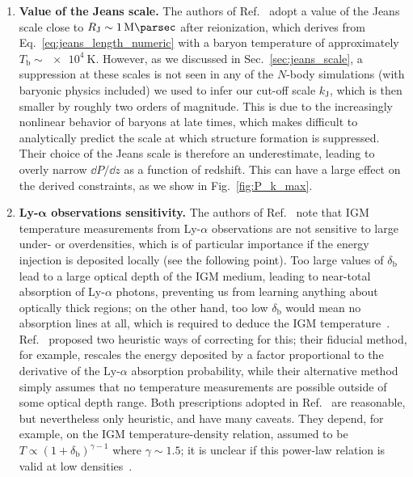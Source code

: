 \documentclass[prd,aps,10pt,nofootinbib,twocolumn,superscriptaddress,preprintnumbers,balancelastpage,longbibliography]{revtex4-1}
\begin{document}
\begin{enumerate}
\item \textbf{Value of the Jeans scale.} The authors of Ref.~\cite{Witte:2020rvb} adopt a value of the Jeans scale close to $R_\text{J} \sim \SI{1}{\mega\parsec}$ after reionization, which derives from Eq.~\eqref{eq:jeans_length_numeric} with a baryon temperature of approximately $T_\text{b} \sim \SI{e4}{\kelvin}$. 
However, as we discussed in Sec.~\ref{sec:jeans_scale}, a suppression at these scales is not seen in any of the $N$-body simulations (with baryonic physics included) we used to infer our cut-off scale $k_\text{J}$, which is then smaller by roughly two orders of magnitude. 
This is due to the increasingly nonlinear behavior of baryons at late times, which makes difficult to analytically predict the scale at which structure formation is suppressed. 
Their choice of the Jeans scale is therefore an underestimate, leading to overly narrow $\dd P/\dd z$ as a function of redshift. This can have a large effect on the derived constraints, as we show in Fig.~\ref{fig:P_k_max}. 

\item \textbf{Ly-$\boldsymbol{\alpha}$ observations sensitivity.} The authors of Ref.~\cite{Witte:2020rvb} note that IGM temperature measurements from Ly-$\alpha$ observations are not sensitive to large under- or overdensities, which is of particular importance if the energy injection is deposited locally (see the following point). 
Too large values of $\delta_\text{b}$ lead to a large optical depth of the IGM medium, leading to near-total absorption of Ly-$\alpha$ photons, preventing us from learning anything about optically thick regions; on the other hand, too low $\delta_\text{b}$ would mean no absorption lines at all, which is required to deduce the IGM temperature~\cite{Becker:2010cu}. 
Ref.~\cite{Witte:2020rvb} proposed two heuristic ways of correcting for this; their fiducial method, for example, rescales the energy deposited by a factor proportional to the derivative of the Ly-$\alpha$ absorption probability, while their alternative method simply assumes that no temperature measurements are possible outside of some optical depth range.
Both prescriptions adopted in Ref.~\cite{Witte:2020rvb} are reasonable, but nevertheless only heuristic, and have many caveats. 
They depend, for example, on the IGM temperature-density relation, assumed to be $T \propto (1+\delta_\text{b})^{\gamma-1}$ where $\gamma \sim 1.5$; it is unclear if this power-law relation is valid at low densities~\cite{Bolton:2007xi, Rorai:2016jfm}.


\end{enumerate}
\end{document}
